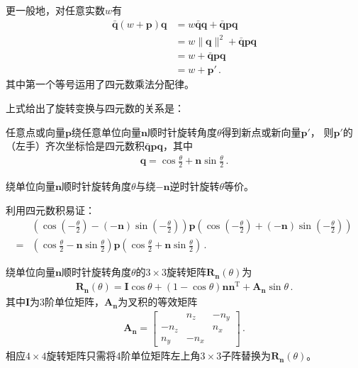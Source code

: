 更一般地，对任意实数$w$有
\begin{align}
    \bar{\bm q}(w+\bm p)\bm q & =w\bar{\bm q}\bm q+\bar{\bm q}\bm p\bm q\nonumber \\
                              & =w\|\bm q\|^2+\bar{\bm q}\bm p\bm q\nonumber      \\
                              & =w+\bar{\bm q}\bm p\bm q\nonumber                 \\
                              & =w+\bm p'\, .
\end{align}
其中第一个等号运用了四元数乘法分配律。

上式给出了旋转变换与四元数的关系是：
\begin{theorem}
    任意点或向量$\bm p$绕任意单位向量$\bm n$顺时针旋转角度$\theta$得到新点或新向量$\bm p'$，
    则$\bm p'$的（左手）齐次坐标恰是四元数积$\bar{\bm q}\bm p\bm q$，其中
    \begin{align}
        \bm q=\cos\frac{\theta}{2}+\bm n\sin\frac{\theta}{2}\, .
    \end{align}
\end{theorem}

\begin{corollary}
    绕单位向量$\bm n$顺时针旋转角度$\theta$与绕$-\bm n$逆时针旋转$\theta$等价。
\end{corollary}

\begin{prove}
    利用四元数积易证：
    \begin{align}
          & (\cos(-\frac{\theta}{2})-(-\bm n)\sin(-\frac{\theta}{2}))\bm p(\cos(-\frac{\theta}{2})+(-\bm n)\sin(-\frac{\theta}{2}))\nonumber \\
        = & (\cos\frac{\theta}{2}-\bm n\sin\frac{\theta}{2})\bm p(\cos\frac{\theta}{2}+\bm n\sin\frac{\theta}{2})\, .
    \end{align}
\end{prove}

\begin{theorem}
    绕单位向量$\bm n$顺时针旋转角度$\theta$的$3\times3$旋转矩阵$\bm R_{\bm n}(\theta)$为
    \begin{align}
        \bm R_{\bm n}(\theta)=\bm I\cos\theta+(1-\cos\theta)\bm n\bm n^\mathrm{T}+\bm A_{\bm n}\sin\theta\, .
    \end{align}
    其中$\bm I$为3阶单位矩阵，$\bm A_{\bm n}$为叉积的等效矩阵
    \begin{align}
        \bm A_{\bm n}=\left[
            \begin{array}{ccc}
                     & n_z  & -n_y \\
                -n_z &      & n_x  \\
                n_y  & -n_x &
            \end{array}
            \right]\, .
    \end{align}
    相应$4\times4$旋转矩阵只需将4阶单位矩阵左上角$3\times3$子阵替换为$\bm R_{\bm n}(\theta)$。
\end{theorem}

